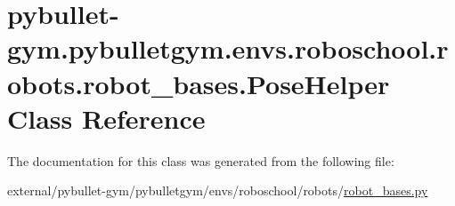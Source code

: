 \hypertarget{classpybullet-gym_1_1pybulletgym_1_1envs_1_1roboschool_1_1robots_1_1robot__bases_1_1_pose_helper}{}\section{pybullet-\/gym.pybulletgym.\+envs.\+roboschool.\+robots.\+robot\+\_\+bases.\+Pose\+Helper Class Reference}
\label{classpybullet-gym_1_1pybulletgym_1_1envs_1_1roboschool_1_1robots_1_1robot__bases_1_1_pose_helper}


The documentation for this class was generated from the following file\+:\begin{DoxyCompactItemize}
\item 
external/pybullet-\/gym/pybulletgym/envs/roboschool/robots/\hyperlink{roboschool_2robots_2robot__bases_8py}{robot\+\_\+bases.\+py}\end{DoxyCompactItemize}
